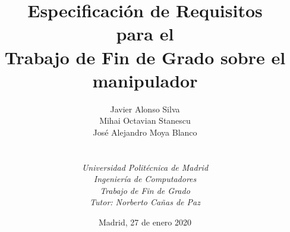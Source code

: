 
\def\Company{Consultancy}
\def\Institute{\textit{Universidad Politécnica de Madrid}}
\def\Course{\textit{Ingeniería de Computadores}}
\def\Module{\textit{Trabajo de Fin de Grado}}
\def\Docent{\textit{Tutor: Norberto Cañas de Paz}}
\def\Assistant{}

\def\BoldTitle{Especificación de Requisitos}

\def\Subtitle{para el \\ Trabajo de Fin de Grado sobre el manipulador \pArm{} \\}
\def\Authors{Javier Alonso Silva \\ Mihai Octavian Stanescu \\ José Alejandro Moya Blanco } 
\def\Shortname{J. Alonso, M. Stanescu, A. Moya}


\title{\textbf{\BoldTitle}\\\Subtitle}
\author{\Authors \\ \\ \\ \Institute\\ \Course\\ \Module\\ \Docent}
\date{Madrid, 27 de enero 2020}

